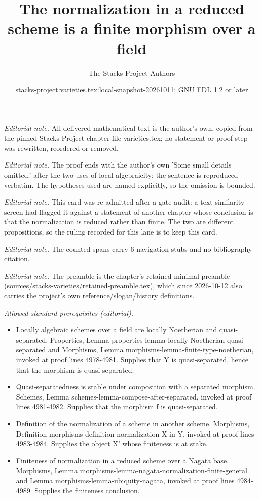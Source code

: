 \documentclass[10pt,a4paper]{amsart}
\title{The normalization in a reduced scheme is a finite morphism over a field}
\author{The Stacks Project Authors}
\date{stacks-project:varieties.tex:local-snapshot-20261011; GNU FDL 1.2 or later}
\theoremstyle{plain}
\theoremstyle{definition}
\theoremstyle{remark}
\numberwithin{equation}{subsection}
\begin{document}
\maketitle
\noindent\textit{Editorial note.} All delivered mathematical text is the author's own, copied from the pinned Stacks Project chapter file varieties.tex; no statement or proof step was rewritten, reordered or removed.\par\medskip
\noindent\textit{Editorial note.} The proof ends with the author's own 'Some small details omitted.' after the two uses of local algebraicity; the sentence is reproduced verbatim. The hypotheses used are named explicitly, so the omission is bounded.\par\medskip
\noindent\textit{Editorial note.} This card was re-admitted after a gate audit: a text-similarity screen had flagged it against a statement of another chapter whose conclusion is that the normalization is reduced rather than finite. The two are different propositions, so the ruling recorded for this lane is to keep this card.\par\medskip
\noindent\textit{Editorial note.} The counted spans carry 6 navigation stubs and no bibliography citation.\par\medskip
\noindent\textit{Editorial note.} The preamble is the chapter's retained minimal preamble (sources/stacks-varieties/retained-preamble.tex), which since 2026-10-12 also carries the project's own reference/slogan/history definitions.\par\medskip
\noindent\textit{Allowed standard prerequisites (editorial).}\begin{itemize}
\item Locally algebraic schemes over a field are locally Noetherian and quasi-separated. Properties, Lemma properties-lemma-locally-Noetherian-quasi-separated and Morphisms, Lemma morphisms-lemma-finite-type-noetherian, invoked at proof lines 4978-4981. Supplies that Y is quasi-separated, hence that the morphism is quasi-separated.
\item Quasi-separatedness is stable under composition with a separated morphism. Schemes, Lemma schemes-lemma-compose-after-separated, invoked at proof lines 4981-4982. Supplies that the morphism f is quasi-separated.
\item Definition of the normalization of a scheme in another scheme. Morphisms, Definition morphisms-definition-normalization-X-in-Y, invoked at proof lines 4983-4984. Supplies the object X' whose finiteness is at stake.
\item Finiteness of normalization in a reduced scheme over a Nagata base. Morphisms, Lemma morphisms-lemma-nagata-normalization-finite-general and Lemma morphisms-lemma-ubiquity-nagata, invoked at proof lines 4984-4989. Supplies the finiteness conclusion.
\end{itemize}\medskip
\end{document}
